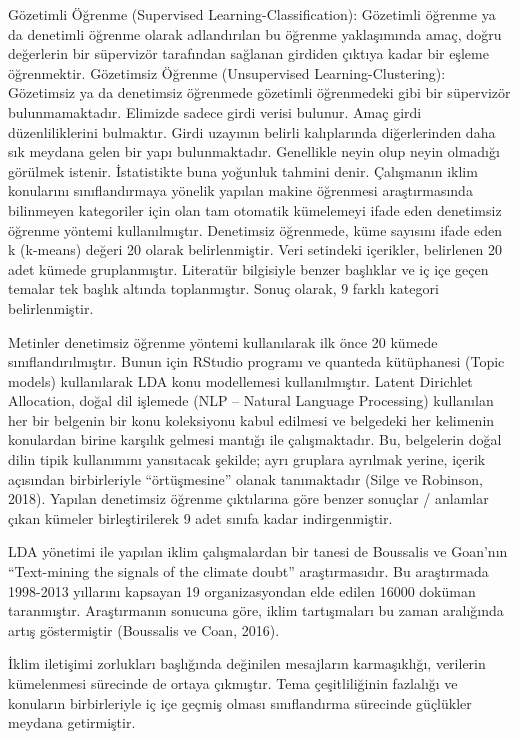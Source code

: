 \documentclass[
]{book}
\begin{document}
Gözetimli Öğrenme (Supervised Learning-Classification): Gözetimli öğrenme ya da denetimli öğrenme olarak adlandırılan bu öğrenme yaklaşımında amaç, doğru değerlerin bir süpervizör tarafından sağlanan girdiden çıktıya kadar bir eşleme öğrenmektir.
Gözetimsiz Öğrenme (Unsupervised Learning-Clustering): Gözetimsiz ya da denetimsiz öğrenmede gözetimli öğrenmedeki gibi bir süpervizör bulunmamaktadır. Elimizde sadece girdi verisi bulunur. Amaç girdi düzenliliklerini bulmaktır. Girdi uzayının belirli kalıplarında diğerlerinden daha sık meydana gelen bir yapı bulunmaktadır. Genellikle neyin olup neyin olmadığı görülmek istenir. İstatistikte buna yoğunluk tahmini denir.
Çalışmanın iklim konularını sınıflandırmaya yönelik yapılan makine öğrenmesi araştırmasında bilinmeyen kategoriler için olan tam otomatik kümelemeyi ifade eden denetimsiz öğrenme yöntemi kullanılmıştır. Denetimsiz öğrenmede, küme sayısını ifade eden k (k-means) değeri 20 olarak belirlenmiştir. Veri setindeki içerikler, belirlenen 20 adet kümede gruplanmıştır. Literatür bilgisiyle benzer başlıklar ve iç içe geçen temalar tek başlık altında toplanmıştır. Sonuç olarak, 9 farklı kategori belirlenmiştir.

Metinler denetimsiz öğrenme yöntemi kullanılarak ilk önce 20 kümede sınıflandırılmıştır. Bunun için RStudio programı ve quanteda kütüphanesi (Topic models) kullanılarak LDA konu modellemesi kullanılmıştır. Latent Dirichlet Allocation, doğal dil işlemede (NLP -- Natural Language Processing) kullanılan her bir belgenin bir konu koleksiyonu kabul edilmesi ve belgedeki her kelimenin konulardan birine karşılık gelmesi mantığı ile çalışmaktadır. Bu, belgelerin doğal dilin tipik kullanımını yansıtacak şekilde; ayrı gruplara ayrılmak yerine, içerik açısından birbirleriyle ``örtüşmesine'' olanak tanımaktadır (Silge ve Robinson, 2018). Yapılan denetimsiz öğrenme çıktılarına göre benzer sonuçlar / anlamlar çıkan kümeler birleştirilerek 9 adet sınıfa kadar indirgenmiştir.

LDA yönetimi ile yapılan iklim çalışmalardan bir tanesi de Boussalis ve Goan'nın ``Text-mining the signals of the climate doubt'' araştırmasıdır. Bu araştırmada 1998-2013 yıllarını kapsayan 19 organizasyondan elde edilen 16000 doküman taranmıştır. Araştırmanın sonucuna göre, iklim tartışmaları bu zaman aralığında artış göstermiştir (Boussalis ve Coan, 2016).

İklim iletişimi zorlukları başlığında değinilen mesajların karmaşıklığı, verilerin kümelenmesi sürecinde de ortaya çıkmıştır. Tema çeşitliliğinin fazlalığı ve konuların birbirleriyle iç içe geçmiş olması sınıflandırma sürecinde güçlükler meydana getirmiştir.
\end{document}
